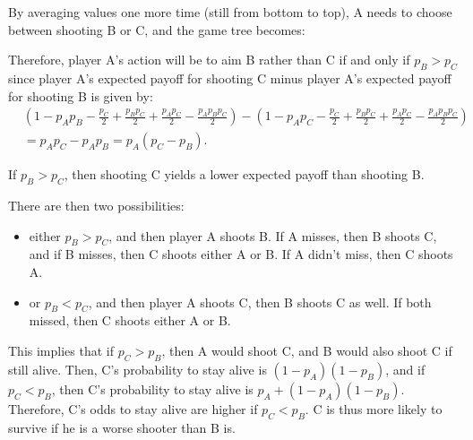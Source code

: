 \documentclass{article}
\begin{document}
By averaging values one more time (still from bottom to top), A needs to choose between shooting B or C, and the game tree becomes:
\begin{figure}[!h]
\centering
{}
\end{figure}

Therefore, player A's action will be to aim B rather than C if and only if $p_B > p_C$ since player A's expected payoff
for shooting C minus player A's expected payoff for shooting B is given by:
\begin{align*}
&\left(1 - p_Ap_B - \frac {p_C}2 + \frac {p_Bp_C}2 + \frac {p_Ap_C}2 - \frac {p_Ap_Bp_C}2\right)
	- \left(1 - p_Ap_C - \frac {p_C}2 + \frac {p_Bp_C}2 + \frac {p_Ap_C}2 - \frac {p_Ap_Bp_C}2\right) \\
&= p_Ap_C - p_Ap_B = p_A(p_C-p_B).
\end{align*}

If $p_B > p_C$, then shooting C yields a lower expected payoff than shooting B.

There are then two possibilities:
\begin{itemize}
	\item either $p_B > p_C$, and then player A shoots B. If A misses, then B shoots C, and if B misses, then C shoots either A or B. If A didn't
	miss, then C shoots A.
	\item or $p_B < p_C$, and then player A shoots C, then B shoots C as well. If both missed, then C shoots either A or B.
\end{itemize}

This implies that if $p_C > p_B$, then A would shoot C, and B would also shoot C if still alive. Then, C's probability to stay alive
is $(1-p_A)(1-p_B)$, and if $p_C < p_B$, then C's probability to stay alive is $p_A + (1-p_A)(1-p_B)$. Therefore, C's odds to stay alive
are higher if $p_C < p_B$. C is thus more likely to survive if he is a worse shooter than B is.
\end{document}
